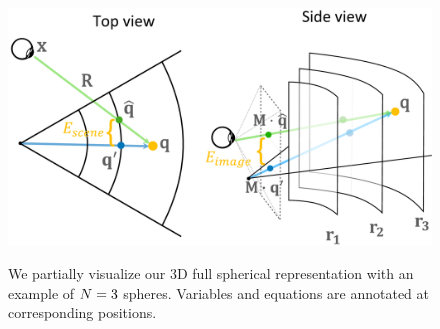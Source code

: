 \begin{figure}
    \centering
    \includegraphics[width=0.96\linewidth]{TOG/figs/parameters.pdf}
    
    {%
    We partially visualize our 3D full spherical representation with an example of $N=3$ spheres. Variables and equations are annotated at corresponding positions.
    }
    \label{fig:notations}
\end{figure}